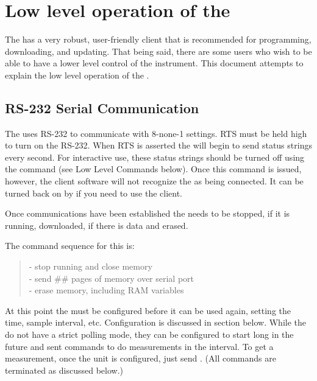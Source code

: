 
\section{Low level operation of the \instType{}}

The \instType{} has a very robust, user-friendly client that is recommended
for programming, downloading, and updating. That being said, there are
some users who wish to be able to have a lower level control of the
instrument. This document attempts to explain the low level operation of
the \instType{}.


\subsection*{RS-232 Serial Communication}

The \instType{} uses RS-232 to communicate with 8-none-1 settings. RTS must
be held high to turn on the RS-232. When RTS is asserted the \instType{}
will begin to send status strings every second. For interactive use,
these status strings should be turned off using the  command (see
Low Level Commands below). Once this command is issued, however, the
client software will not recognize the \instType{} as being connected. It can
be turned back on by  if you need to use the client.

Once communications have been established the \instType{} needs to be
stopped, if it is running, downloaded, if there is data and erased.

The command sequence for this is:
\begin{quote}
	 - stop running and close memory\\
	 - send \#\# pages of memory over serial port\\
	 - erase memory, including RAM variables
\end{quote}

At this point the \instType{} must be configured before it can be used
again, setting the time, sample interval, etc. Configuration is
discussed in section below. While the \instType{} do not have a strict
polling mode, they can be configured to start long in the future and
sent commands to do measurements in the interval. To get a measurement,
once the unit is configured, just send . (All commands are 
terminated as discussed below.)


